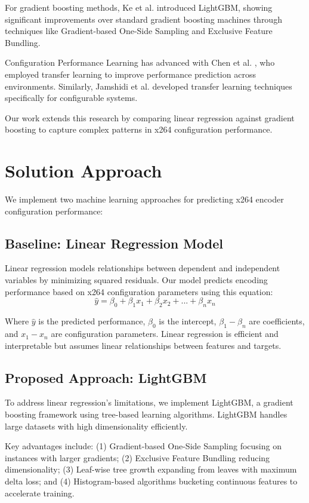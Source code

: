 \documentclass[10pt]{article}
\begin{document}
For gradient boosting methods, Ke et al. \cite{ke2017lightgbm} introduced LightGBM, showing significant improvements over standard gradient boosting machines through techniques like Gradient-based One-Side Sampling and Exclusive Feature Bundling.

Configuration Performance Learning has advanced with Chen et al. \cite{chen2020learning}, who employed transfer learning to improve performance prediction across environments. Similarly, Jamshidi et al. \cite{jamshidi2017learning} developed transfer learning techniques specifically for configurable systems.

Our work extends this research by comparing linear regression against gradient boosting to capture complex patterns in x264 configuration performance.

\section{Solution Approach}
We implement two machine learning approaches for predicting x264 encoder configuration performance:

\subsection{Baseline: Linear Regression Model}
Linear regression models relationships between dependent and independent variables by minimizing squared residuals. Our model predicts encoding performance based on x264 configuration parameters using this equation:
\begin{equation}
\hat{y} = \beta_0 + \beta_1 x_1 + \beta_2 x_2 + ... + \beta_n x_n
\end{equation}

Where $\hat{y}$ is the predicted performance, $\beta_0$ is the intercept, $\beta_1 - \beta_n$ are coefficients, and $x_1 - x_n$ are configuration parameters. Linear regression is efficient and interpretable but assumes linear relationships between features and targets.

\subsection{Proposed Approach: LightGBM}
To address linear regression's limitations, we implement LightGBM, a gradient boosting framework using tree-based learning algorithms. LightGBM handles large datasets with high dimensionality efficiently.

Key advantages include: (1) Gradient-based One-Side Sampling focusing on instances with larger gradients; (2) Exclusive Feature Bundling reducing dimensionality; (3) Leaf-wise tree growth expanding from leaves with maximum delta loss; and (4) Histogram-based algorithms bucketing continuous features to accelerate training.
\end{document}
